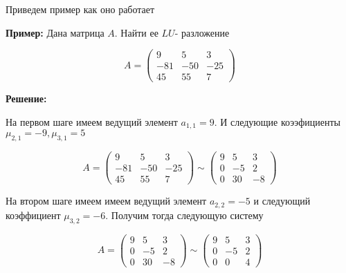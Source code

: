 \documentclass[a4paper,article,14pt]{extarticle}
\begin{document}
Приведем пример как оно работает 

\textbf{Пример:} Дана матрица $ A $. Найти ее $LU$- разложение

\begin{equation}
    A = \left(
        \begin{matrix}
            9 & 5 & 3 \\
            -81 & -50 & -25 \\
            45 & 55 & 7
        \end{matrix}
    \right)
\end{equation}

\textbf{Решение:}

На первом шаге имеем ведущий элемент $ a_{1, 1} = 9 $. И следующие
коээфициенты $ \mu_{2, 1} = -9, \mu_{3, 1} = 5 $

\begin{equation}
    A = \left(
        \begin{matrix}
            9 & 5 & 3 \\
            -81 & -50 & -25 \\
            45 & 55 & 7
        \end{matrix}
    \right) \sim
        \left(
            \begin{matrix}
                9 & 5 & 3 \\
                0 & -5 & 2 \\
                0 & 30 & -8
            \end{matrix}
        \right)
\end{equation}

На втором шаге имеем имеем ведущий элемент $ a_{2, 2} = -5 $
и следующий коэффициент $ \mu_{3, 2} = -6 $. Получим тогда следующую систему

\begin{equation}
    A = \left(
            \begin{matrix}
                9 & 5 & 3 \\
                0 & -5 & 2 \\
                0 & 30 & -8
            \end{matrix}
        \right) \sim 
        \left(
            \begin{matrix}
                9 & 5 & 3 \\
                0 & -5 & 2 \\
                0 & 0 & 4
            \end{matrix}
        \right)
\end{equation}
\end{document}
